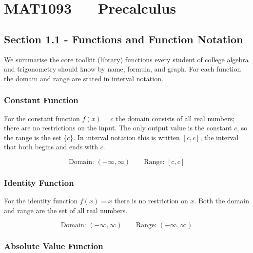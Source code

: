 \chapter{MAT1093 --- Precalculus}
\label{chap:unit-2531}

\ChapterWarning

\section{Section 1.1 - Functions and Function Notation}
\label{sec:sect-c5c2}

We summarise the core toolkit (library) functions every student of college
algebra and trigonometry should know by name, formula, and graph.  For each
function the domain and range are stated in interval notation.

\subsection*{Constant Function}

For the constant function $f(x) = c$ the domain consists of all real numbers;
there are no restrictions on the input.  The only output value is the constant
$c$, so the range is the set $\{c\}$.  In interval notation this is written
$[c,c]$, the interval that both begins and ends with $c$.

\[
  \text{Domain: }(-\infty, \infty) \qquad \text{Range: }[c, c]
\]

\subsection*{Identity Function}

For the identity function $f(x) = x$ there is no restriction on $x$.  Both
the domain and range are the set of all real numbers.

\[
  \text{Domain: }(-\infty, \infty) \qquad \text{Range: }(-\infty, \infty)
\]

\subsection*{Absolute Value Function}

